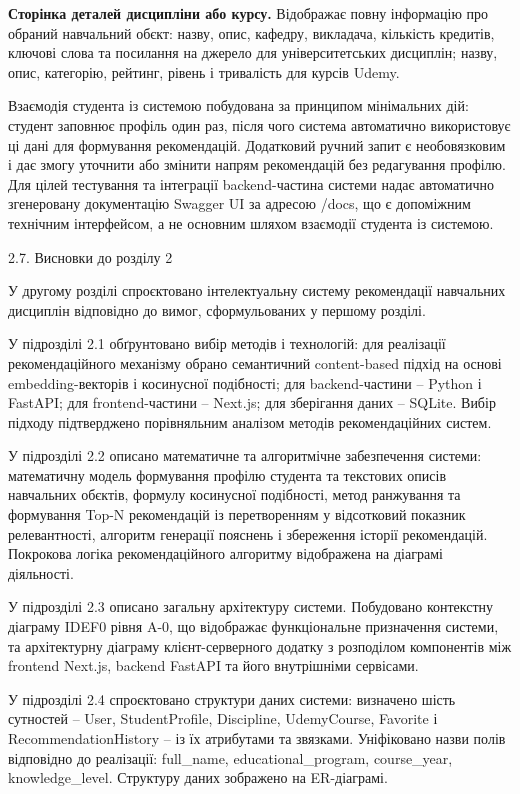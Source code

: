 \documentclass[
]{article}
\begin{document}
\textbf{Сторінка деталей дисципліни або курсу.} Відображає повну
інформацію про обраний навчальний об\textquotesingle єкт: назву, опис,
кафедру, викладача, кількість кредитів, ключові слова та посилання на
джерело для університетських дисциплін; назву, опис, категорію, рейтинг,
рівень і тривалість для курсів Udemy.

Взаємодія студента із системою побудована за принципом мінімальних дій:
студент заповнює профіль один раз, після чого система автоматично
використовує ці дані для формування рекомендацій. Додатковий ручний
запит є необов\textquotesingle язковим і дає змогу уточнити або змінити
напрям рекомендацій без редагування профілю. Для цілей тестування та
інтеграції backend-частина системи надає автоматично згенеровану
документацію Swagger UI за адресою /docs, що є допоміжним технічним
інтерфейсом, а не основним шляхом взаємодії студента із системою.

\protect{}\label{_Toc230434093}{}2.7. Висновки до розділу 2

У другому розділі спроєктовано інтелектуальну систему рекомендації
навчальних дисциплін відповідно до вимог, сформульованих у першому
розділі.

У підрозділі 2.1 обґрунтовано вибір методів і технологій: для реалізації
рекомендаційного механізму обрано семантичний content-based підхід на
основі embedding-векторів і косинусної подібності; для backend-частини
-- Python і FastAPI; для frontend-частини -- Next.js; для зберігання
даних -- SQLite. Вибір підходу підтверджено порівняльним аналізом
методів рекомендаційних систем.

У підрозділі 2.2 описано математичне та алгоритмічне забезпечення
системи: математичну модель формування профілю студента та текстових
описів навчальних об\textquotesingle єктів, формулу косинусної
подібності, метод ранжування та формування Top-N рекомендацій із
перетворенням у відсотковий показник релевантності, алгоритм генерації
пояснень і збереження історії рекомендацій. Покрокова логіка
рекомендаційного алгоритму відображена на діаграмі діяльності.

У підрозділі 2.3 описано загальну архітектуру системи. Побудовано
контекстну діаграму IDEF0 рівня A-0, що відображає функціональне
призначення системи, та архітектурну діаграму клієнт-серверного додатку
з розподілом компонентів між frontend Next.js, backend FastAPI та його
внутрішніми сервісами.

У підрозділі 2.4 спроєктовано структури даних системи: визначено шість
сутностей -- User, StudentProfile, Discipline, UdemyCourse, Favorite і
RecommendationHistory -- із їх атрибутами та зв\textquotesingle язками.
Уніфіковано назви полів відповідно до реалізації: full\_name,
educational\_program, course\_year, knowledge\_level. Структуру даних
зображено на ER-діаграмі.
\end{document}
